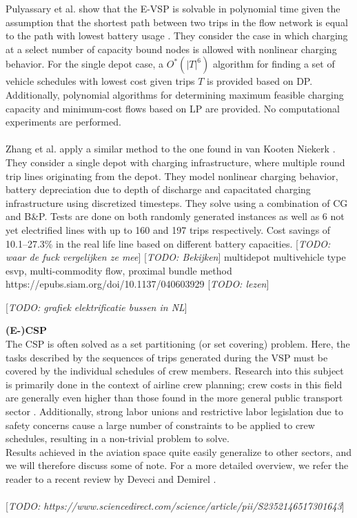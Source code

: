 \documentclass[]{article}
\newcommand{\todo}[1]{{\color{red}[\textit{TODO: #1}]}}
\begin{document}
Pulyassary et al. show that the E-VSP is solvable in polynomial time given the
assumption that the shortest path between two trips in the flow network is
equal to the path with lowest battery usage \cite{Pulyassary2024}. They
consider the case in which charging at a select number of capacity bound nodes
is allowed with nonlinear charging behavior. For the single depot case, a
$O^*(|T|^6)$ algorithm for finding a set of vehicle schedules with lowest cost
given trips $T$ is provided based on DP. Additionally, polynomial algorithms
for determining maximum feasible charging capacity and minimum-cost flows based
on LP are provided. No computational experiments are performed. \\\\

Zhang et al. apply a similar method to the one found in van Kooten Niekerk
\cite{Zhang2021}. They consider a single depot with charging infrastructure,
where multiple round trip lines originating from the depot. They model
nonlinear charging behavior, battery depreciation due to depth of discharge and
capacitated charging infrastructure using discretized timesteps. They solve
using a combination of CG and B\&P. Tests are done on both randomly generated
instances as well as 6 not yet electrified lines with up to 160 and 197 trips
respectively. Cost savings of 10.1–27.3\% in the real life line based on
different battery capacities. \todo{waar de fuck vergelijken ze mee}
\todo{Bekijken} multidepot multivehicle type esvp, multi-commodity flow,
proximal bundle method https://epubs.siam.org/doi/10.1137/040603929
\todo{lezen}\cite{Borndörfer2024}

\todo{grafiek elektrificatie bussen in NL}

\noindent \textbf{(E-)CSP}\\
The CSP is often solved as a set partitioning (or set covering) problem. Here, the tasks described by the sequences of trips generated during the VSP must be covered by the individual schedules of crew members. Research into this subject is primarily done in the context of airline crew planning; crew costs in this field are generally even higher than those found in the more general public transport sector \cite{Barnhart2003}. Additionally, strong labor unions and restrictive labor legislation due to safety concerns cause a large number of constraints to be applied to crew schedules, resulting in a non-trivial problem to solve. \\
Results achieved in the aviation space quite easily generalize to other sectors, and we will therefore discuss some of note. For a more detailed overview, we refer the reader to a recent review by Deveci and Demirel \cite{Deveci2018}. \\\\
\todo{https://www.sciencedirect.com/science/article/pii/S2352146517301643}
\end{document}
